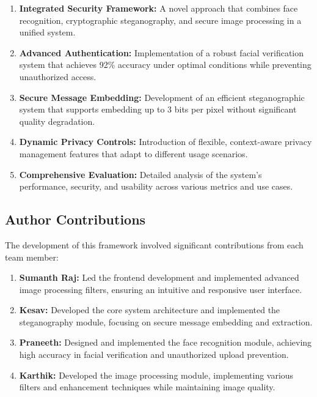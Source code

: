\documentclass[pdflatex,sn-mathphys-num]{sn-jnl}%
\theoremstyle{thmstyleone}%
\theoremstyle{thmstyletwo}%
\theoremstyle{thmstylethree}%
\begin{document}
\begin{enumerate}
    \item \textbf{Integrated Security Framework:} A novel approach that combines face recognition, cryptographic steganography, and secure image processing in a unified system.
    
    \item \textbf{Advanced Authentication:} Implementation of a robust facial verification system that achieves 92\% accuracy under optimal conditions while preventing unauthorized access.
    
    \item \textbf{Secure Message Embedding:} Development of an efficient steganographic system that supports embedding up to 3 bits per pixel without significant quality degradation.
    
    \item \textbf{Dynamic Privacy Controls:} Introduction of flexible, context-aware privacy management features that adapt to different usage scenarios.
    
    \item \textbf{Comprehensive Evaluation:} Detailed analysis of the system's performance, security, and usability across various metrics and use cases.
\end{enumerate}

\subsection{Author Contributions}
The development of this framework involved significant contributions from each team member:

\begin{enumerate}
    \item \textbf{Sumanth Raj:} Led the frontend development and implemented advanced image processing filters, ensuring an intuitive and responsive user interface.
    
    \item \textbf{Kesav:} Developed the core system architecture and implemented the steganography module, focusing on secure message embedding and extraction.
    
    \item \textbf{Praneeth:} Designed and implemented the face recognition module, achieving high accuracy in facial verification and unauthorized upload prevention.
    
    \item \textbf{Karthik:} Developed the image processing module, implementing various filters and enhancement techniques while maintaining image quality.
\end{enumerate}
\end{document}
